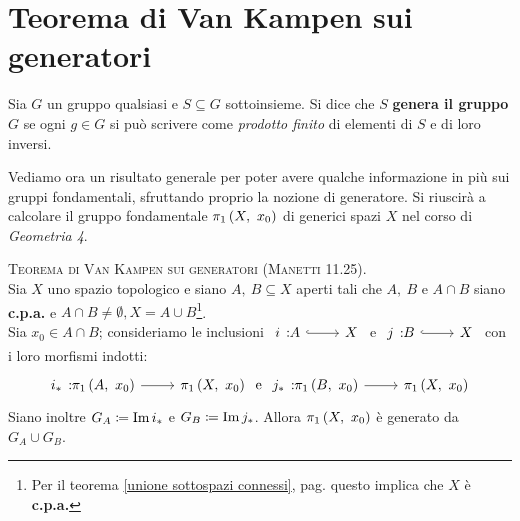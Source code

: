 \section{Teorema di Van Kampen sui generatori}
\begin{remember}
	Sia $G$ un gruppo qualsiasi e $S\subseteq G$ sottoinsieme. Si dice che $S$ \textbf{genera il gruppo} $G$ se ogni $g\in G$ si può scrivere come \textit{prodotto finito} di elementi di $S$ e di loro inversi. 
\end{remember}
Vediamo ora un risultato generale per poter avere qualche informazione in più sui gruppi fondamentali, sfruttando proprio la nozione di generatore. Si riuscirà a calcolare il gruppo fondamentale $\gruf{X}{x_0}$ di generici spazi $X$ nel corso di \textit{Geometria 4}.
\begin{theorema} \textsc{Teorema di Van Kampen sui generatori (Manetti 11.25).} \label{Van Kampen} \\
	Sia $X$ uno spazio topologico e siano $A,\ B\subseteq X$ aperti tali che $A,\ B$ e $A\cap B$ siano \textbf{c.p.a.} e $A\cap B\neq\emptyset, X=A\cup B$\footnote{Per il teorema \ref{unione sottospazi connessi}, pag. \pageref{unione sottospazi connessi} questo implica che $X$ è \textbf{c.p.a.}}. \\
	Sia $x_0\in A\cap B$; consideriamo le inclusioni $\incl i A X$ e $\incl j B X$ con i loro morfismi indotti:
	\begin{equation}
		\funz {i_\ast} {\gruf{A}{x_0}} {\gruf{X}{x_0}}\text{ e }\funz {j_\ast} {\gruf{B}{x_0}} {\gruf{X}{x_0}}
	\end{equation}
	Siano inoltre $G_A\coloneqq \operatorname{Im} i_\ast$ e $G_B\coloneqq \operatorname{Im} j_\ast$. Allora $\gruf{X}{x_0}$ è generato da $G_A\cup G_B$.
\end{theorema}
